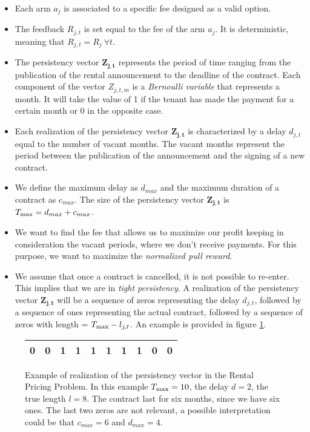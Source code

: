 \begin{itemize}
	\item Each arm $a_j$ is associated to a specific fee designed as a valid option.
	\item The feedback $R_{j,t}$ is set equal to the fee of the arm $a_j$. It is deterministic, meaning that $R_{j,t} = R_j \ \forall t$.  
	\item The persistency vector $\boldsymbol{Z_{j,t}}$ represents the period of time ranging from the publication of the rental announcement to the deadline of the contract. Each component of the vector $Z_{j,t,m}$ is a \emph{Bernoulli variable} that represents a month. It will take the value of 1 if the tenant has made the payment for a certain month or 0 in the opposite case.
	\item Each realization of the persistency vector $\boldsymbol{Z_{j,t}}$ is characterized by a delay $d_{j,t}$ equal to the number of vacant months. The vacant months represent the period between the publication of the announcement and the signing of a new contract.
	\item We define the maximum delay as $d_{max}$ and the maximum duration of a contract as $c_{max}$. The size of the persistency vector $\boldsymbol{Z_{j,t}}$ is $T_{\textnormal{max}} = d_{max} + c_{max}$.
	\item We want to find the fee that allows us to maximize our profit keeping in consideration the vacant periods, where we don't receive payments. For this purpose, we want to maximize the \emph{normalized pull reward}.
	\item We assume that once a contract is cancelled, it is not possible to re-enter. This implies that we are in \emph{tight persistency}. A realization of the persistency vector $\boldsymbol{Z_{j,t}}$ will be a sequence of zeros representing the delay $d_{j,t}$, followed by a sequence of ones representing the actual  contract, followed by a sequence of zeros with length = $T_{\textnormal{max}}-l_{j,t}$. An example is provided in figure \ref{bucket_affitto}.
\end{itemize}
 	


\begin{figure}[h]
	\centering
	
	

		\begin{tabular}{|cccccccccc|}
			\hline
			0 & 0 & 1 & 1 & 1 & 1 & 1 & 1 & 0 & 0 \\ \hline
		\end{tabular}
	
	
	
	
	\caption{Example of realization of the persistency vector in the Rental Pricing Problem. In this example $T_{\textnormal{max}}=10$, the delay $d=2$, the true length $l=8$. The contract last for six months, since we have six ones. The last two zeros are not relevant, a possible interpretation could be that $c_{max}=6$ and $d_{max}=4$.}
	\label{bucket_affitto}
\end{figure}



